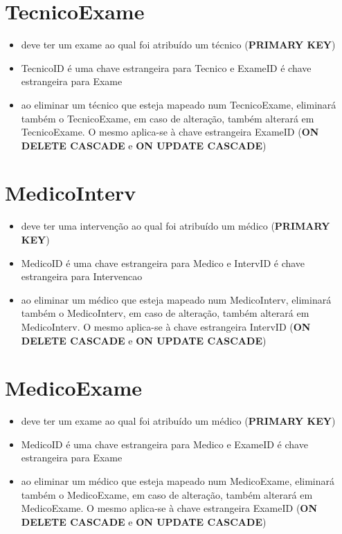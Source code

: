 \documentclass[article, a4paper, 12pt, oneside]{memoir}
\begin{document}
\section*{TecnicoExame}
\begin{itemize}
	\item deve ter um exame ao qual foi atribuído um técnico (\textbf{PRIMARY KEY})
	\item TecnicoID é uma chave estrangeira para Tecnico e ExameID é chave estrangeira para Exame
	\item ao eliminar um técnico que esteja mapeado num TecnicoExame, eliminará também o TecnicoExame, em caso de alteração, também alterará em TecnicoExame. O mesmo aplica-se à chave estrangeira ExameID (\textbf{ON DELETE CASCADE} e \textbf{ON UPDATE CASCADE})
\end{itemize}

\section*{MedicoInterv}
\begin{itemize}
	\item deve ter uma intervenção ao qual foi atribuído um médico (\textbf{PRIMARY KEY})
	\item MedicoID é uma chave estrangeira para Medico e IntervID é chave estrangeira para Intervencao
	\item ao eliminar um médico que esteja mapeado num MedicoInterv, eliminará também o MedicoInterv, em caso de alteração, também alterará em MedicoInterv. O mesmo aplica-se à chave estrangeira IntervID (\textbf{ON DELETE CASCADE} e \textbf{ON UPDATE CASCADE})
\end{itemize}

\section*{MedicoExame}
\begin{itemize}
	\item deve ter um exame ao qual foi atribuído um médico (\textbf{PRIMARY KEY})
	\item MedicoID é uma chave estrangeira para Medico e ExameID é chave estrangeira para Exame
	\item ao eliminar um médico que esteja mapeado num MedicoExame, eliminará também o MedicoExame, em caso de alteração, também alterará em MedicoExame. O mesmo aplica-se à chave estrangeira ExameID (\textbf{ON DELETE CASCADE} e \textbf{ON UPDATE CASCADE})
\end{itemize}
\end{document}
